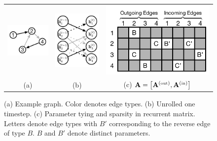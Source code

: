 \documentclass{article}
\begin{document}
\begin{figure}[t]
\begin{center}
\begin{tabular}{ccc}
\includegraphics[width=.25 \columnwidth]{figs/example-graph.pdf} &
\includegraphics[width=.18 \columnwidth]{figs/unrolled-graph3.pdf} &
\includegraphics[width=.32 \columnwidth]{figs/recurrent-matrix-sparsity-pattern2.pdf}
\\
(a) & (b) & (c) $\Av = \left[ \Av^{(\hbox{\tiny{out}})},  \Av^{(\hbox{\tiny{in}})} \right]$
\end{tabular}
\end{center}
\vspace{-10pt}
\caption{
  (a) Example graph. Color denotes edge types.
  (b) Unrolled one timestep.
  (c) Parameter tying and sparsity in recurrent matrix. Letters denote
  edge types with $B'$ corresponding to the reverse edge of type $B$.
  $B$ and $B'$ denote distinct parameters.
}
\label{fig:graphs-and-sparsity}
\end{figure}
\end{document}
